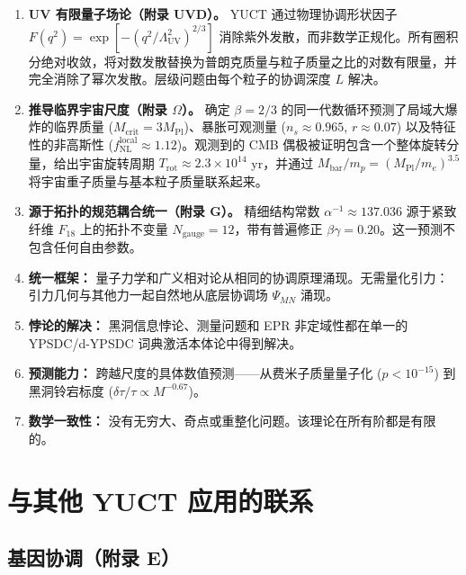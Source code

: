 \documentclass[11pt,a4paper]{article}
\theoremstyle{remark}
\begin{document}
	\begin{enumerate}
		\item \textbf{UV 有限量子场论（附录 UVD）。}
		YUCT 通过物理协调形状因子 $F(q^2)=\exp[-(q^2/\Lambda_{\mathrm{UV}}^2)^{2/3}]$ 消除紫外发散，而非数学正规化。所有圈积分绝对收敛，将对数发散替换为普朗克质量与粒子质量之比的对数有限量，并完全消除了幂次发散。层级问题由每个粒子的协调深度 $L$ 解决。
		
		\item \textbf{推导临界宇宙尺度（附录 $\Omega$）。}
		确定 $\beta=2/3$ 的同一代数循环预测了局域大爆炸的临界质量 ($M_{\mathrm{crit}}=3M_{\mathrm{Pl}}$)、暴胀可观测量 ($n_s\approx0.965$, $r\approx0.07$) 以及特征性的非高斯性 ($f_{\mathrm{NL}}^{\mathrm{local}}\approx1.12$)。观测到的 CMB 偶极被证明包含一个整体旋转分量，给出宇宙旋转周期 $T_{\mathrm{rot}}\approx2.3\times10^{14}$ yr，并通过 $M_{\mathrm{bar}}/m_p=(M_{\mathrm{Pl}}/m_e)^{3.5}$ 将宇宙重子质量与基本粒子质量联系起来。
		
		\item \textbf{源于拓扑的规范耦合统一（附录 G）。}
		精细结构常数 $\alpha^{-1}\approx137.036$ 源于紧致纤维 $F_{18}$ 上的拓扑不变量 $N_{\mathrm{gauge}}=12$，带有普遍修正 $\beta\gamma=0.20$。这一预测不包含任何自由参数。
		
		\item \textbf{统一框架：} 量子力学和广义相对论从相同的协调原理涌现。无需量化引力：引力几何与其他力一起自然地从底层协调场 $\Psi_{MN}$ 涌现。
		
		\item \textbf{悖论的解决：} 黑洞信息悖论、测量问题和 EPR 非定域性都在单一的 YPSDC/d-YPSDC 词典激活本体论中得到解决。
		
		\item \textbf{预测能力：} 跨越尺度的具体数值预测——从费米子质量量子化 ($p<10^{-15}$) 到黑洞铃宕标度 ($\delta\tau/\tau\propto M^{-0.67}$)。
		
		\item \textbf{数学一致性：} 没有无穷大、奇点或重整化问题。该理论在所有阶都是有限的。
	\end{enumerate}
	
	\section{与其他 YUCT 应用的联系}
	\label{sec:connections}
	
	\subsection{基因协调（附录 E）}
	
\end{document}
